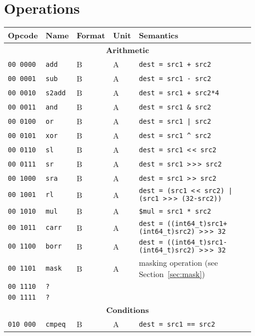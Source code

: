 \documentclass[10pt,a4paper]{article}
\newcommand{\shl}{\textless$\,\!$\textless}
\newcommand{\shr}{\textgreater$\,\!$\textgreater$\,\!$\textgreater}
\newcommand{\ashr}{\textgreater$\,\!$\textgreater}
\begin{document}
\pagebreak

\section{Operations}

\begin{longtable}{llllp{}}
\toprule
Opcode & Name & Format & Unit & Semantics \\
\midrule
\multicolumn{5}{c}{\textbf{Arithmetic}} \\
\cmidrule{1-5}
\texttt{00 0000} & \texttt{add} & B & A & \texttt{dest = src1 + src2} \\
\texttt{00 0001} & \texttt{sub} & B & A & \texttt{dest = src1 - src2} \\
\texttt{00 0010} & \texttt{s2add} & B & A & \texttt{dest = src1 + src2*4} \\
\texttt{00 0011} & \texttt{and} & B & A & \texttt{dest = src1 \& src2} \\
\texttt{00 0100} & \texttt{or} & B & A & \texttt{dest = src1 | src2} \\
\texttt{00 0101} & \texttt{xor} & B & A & \texttt{dest = src1 \textasciicircum{} src2} \\
\texttt{00 0110} & \texttt{sl} & B & A & \texttt{dest = src1 \shl{} src2} \\
\texttt{00 0111} & \texttt{sr} & B & A & \texttt{dest = src1 \shr{} src2} \\
\texttt{00 1000} & \texttt{sra} & B & A & \texttt{dest = src1 \ashr{} src2} \\
\texttt{00 1001} & \texttt{rl} & B & A & \texttt{dest = (src1 \shl{} src2) | (src1 \shr{} (32-src2))} \\
\texttt{00 1010} & \texttt{mul} & B & A & \texttt{\$mul = src1 * src2} \\
\texttt{00 1011} & \texttt{carr} & B & A & \texttt{dest = ((int64\_t)src1+(int64\_t)src2) \shr{} 32} \\
\texttt{00 1100} & \texttt{borr} & B & A & \texttt{dest = ((int64\_t)src1-(int64\_t)src2) \shr{} 32} \\
\texttt{00 1101} & \texttt{mask} & B & A & masking operation (see Section~\ref{sec:mask}) \\
\texttt{00 1110} & \texttt{?} & & & \\
\texttt{00 1111} & \texttt{?} & & & \\
\midrule
\multicolumn{5}{c}{\textbf{Conditions}} \\
\cmidrule{1-5}
\texttt{010 000} & \texttt{cmpeq} & B & A & \texttt{dest = src1 == src2} \\

\end{longtable}
\end{document}
